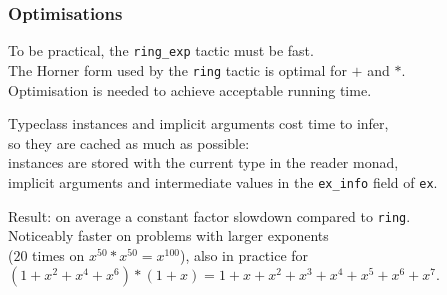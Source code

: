 \documentclass{beamer}
\newcommand{\lean}[1]{\texttt{#1}\xspace} %
\newcommand{\ring}{\lean{ring}}
\newcommand{\ringexp}{\lean{ring\_exp}}
\begin{document}
\begin{frame} \frametitle{Optimisations}
To be practical, the \ringexp tactic must be fast.\\
The Horner form used by the \ring tactic is optimal for $+$ and $*$.\\
Optimisation is needed to achieve acceptable running time.

\pause
Typeclass instances and implicit arguments cost time to infer,\\
so they are cached as much as possible:\\
instances are stored with the current type in the reader monad,\\
implicit arguments and intermediate values in the \lean{ex\_info} field of \lean{ex}.

\pause
Result: on average a constant factor slowdown compared to \ring.\\
Noticeably faster on problems with larger exponents\\
($20$ times on $x^{50} * x^{50} = x^{100}$),
also in practice for $(1 + x^2 + x^4 + x^6) * (1 + x) = 1 + x + x^2 + x^3 + x^4 + x^5 + x^6 + x^7$.
\end{frame}

\begin{frame}
\printbibliography
\end{frame}
\end{document}
